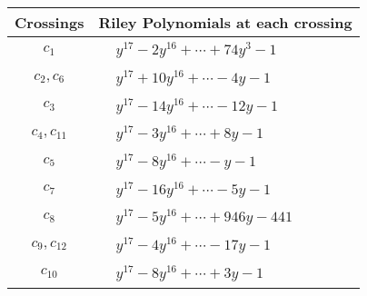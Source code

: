 \documentclass[1p]{elsarticle_modified}
\theoremstyle{definition}
\begin{document}
\begin{tabular}{m{50pt}|m{274pt}}
Crossings & \hspace{64pt}Riley Polynomials at each crossing \\
\hline $$\begin{aligned}c_{1}\end{aligned}$$&$\begin{aligned}
&y^{17}-2 y^{16}+\cdots+74 y^3-1
\end{aligned}$\\
\hline $$\begin{aligned}c_{2},c_{6}\end{aligned}$$&$\begin{aligned}
&y^{17}+10 y^{16}+\cdots-4 y-1
\end{aligned}$\\
\hline $$\begin{aligned}c_{3}\end{aligned}$$&$\begin{aligned}
&y^{17}-14 y^{16}+\cdots-12 y-1
\end{aligned}$\\
\hline $$\begin{aligned}c_{4},c_{11}\end{aligned}$$&$\begin{aligned}
&y^{17}-3 y^{16}+\cdots+8 y-1
\end{aligned}$\\
\hline $$\begin{aligned}c_{5}\end{aligned}$$&$\begin{aligned}
&y^{17}-8 y^{16}+\cdots- y-1
\end{aligned}$\\
\hline $$\begin{aligned}c_{7}\end{aligned}$$&$\begin{aligned}
&y^{17}-16 y^{16}+\cdots-5 y-1
\end{aligned}$\\
\hline $$\begin{aligned}c_{8}\end{aligned}$$&$\begin{aligned}
&y^{17}-5 y^{16}+\cdots+946 y-441
\end{aligned}$\\
\hline $$\begin{aligned}c_{9},c_{12}\end{aligned}$$&$\begin{aligned}
&y^{17}-4 y^{16}+\cdots-17 y-1
\end{aligned}$\\
\hline $$\begin{aligned}c_{10}\end{aligned}$$&$\begin{aligned}
&y^{17}-8 y^{16}+\cdots+3 y-1
\end{aligned}$\\
\hline
\end{tabular}\\~\\
\end{document}
